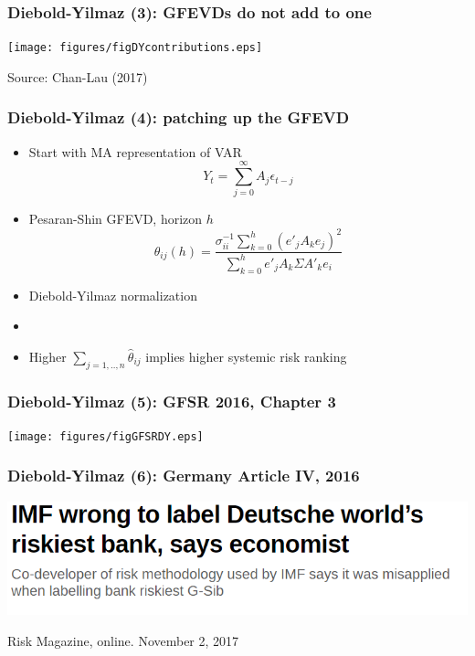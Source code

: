 \documentclass[aspectratio=43,dvipsnames,usenames, svgnames]{beamer}
\begin{document}
\begin{frame} %
\frametitle{Diebold-Yilmaz (3): GFEVDs do not add to one}
  \begin{center}
    \texttt{[image: figures/figDYcontributions.eps]}  
  \end{center}
  \tiny{Source: Chan-Lau (2017)}
\end{frame}

\begin{frame} %
\frametitle{Diebold-Yilmaz (4): patching up the GFEVD}
  \begin{itemize}
    \item Start with MA representation of VAR
    \[Y_t = \sum_{j=0}^{\infty} A_j \epsilon_{t-j} \]
    \item Pesaran-Shin GFEVD, horizon $h$
    \begin{equation*}
        \theta_{ij}(h) = \frac{\sigma_{ii}^{-1} \sum_{k=0}^{h}(e'_{j} A_k e_{j})^2}
    {\sum_{k=0}^{h} {e'_j} {A_k} \Sigma {A'_{k}} e_i}
    \end{equation*}     
    \item Diebold-Yilmaz normalization
    \smallskip
    \item[]
    \begin{center}
    \end{center}
    \item Higher $\sum_{j=1,..,n}\hat{\theta}_{ij}$ implies higher systemic risk ranking 
  \end{itemize}
\end{frame}

\begin{frame} %
\frametitle{Diebold-Yilmaz (5): GFSR 2016, Chapter 3}
\begin{center}
	\texttt{[image: figures/figGFSRDY.eps]}
\end{center}
\end{frame}

\begin{frame} %
\frametitle{Diebold-Yilmaz (6): Germany Article IV, 2016}
\begin{center}
	\includegraphics[scale=0.65]{figures/figRiskDieboldYilmaz.png}
\end{center}
\begin{flushleft}
\tiny{Risk Magazine, online. November 2, 2017}
\end{flushleft}
\end{frame}
\end{document}
